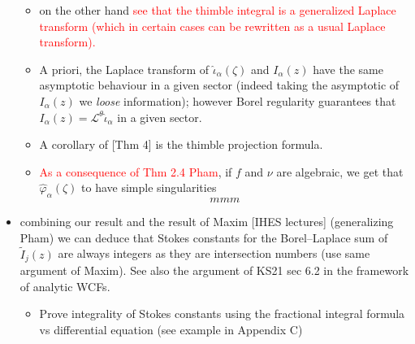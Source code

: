 \documentclass{article}
\theoremstyle{definition}
\newcommand{\laplace}{\mathcal{L}}
\newcommand{\borel}{\mathcal{B}}
\newcommand{\aexp}{\text{\ae}}
\begin{document}
\begin{itemize}
\begin{itemize}
\item on the other hand \textcolor{red}{see that the thimble integral is a generalized Laplace transform (which in certain cases can be rewritten as a usual Laplace transform).}
\item A priori, the Laplace transform of $\hat{\iota}_\alpha(\zeta)$ and $I_{\alpha}(z)$ have the same asymptotic behaviour in a given sector (indeed taking the asymptotic of $I_\alpha(z)$ we \textit{loose} information); however Borel regularity guarantees that $I_{\alpha}(z)=\laplace^{\theta}\hat{\iota}_{\alpha}$ in a given sector.
\item A corollary of [Thm 4] is the thimble projection formula.
\item \textcolor{red}{As a consequence of Thm 2.4 Pham}, if $f$ and $\nu$ are algebraic, we get that $\hat{\varphi}_\alpha(\zeta)$ to have simple singularities 
\begin{equation}
mmm
\end{equation} 
\end{itemize}
\item \text{[Cor]:} combining our result and the result of Maxim [IHES lectures] (generalizing Pham) we can deduce that Stokes constants for the Borel--Laplace sum of $\tilde{I}_j(z)$ are always integers as they are intersection numbers (use same argument of Maxim). See also the argument of KS21 sec 6.2 in the framework of analytic WCFs. 
\begin{itemize}
\item Prove integrality of Stokes constants using the fractional integral formula vs differential equation (see example in Appendix C) 
\end{itemize}
\end{itemize}
\color{black}



\end{document}
